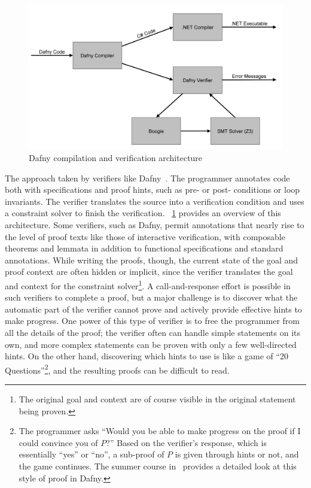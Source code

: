\begin{figure}[ht]
    \includegraphics[width=\textwidth]{img/dafny_architecture}
    \caption{Dafny compilation and verification
    architecture~\cite{Herbert2012}}\label{F:dafny_arch}
\end{figure}

The approach taken by verifiers like Dafny~\cite{leino2010dafny}. The programmer
annotates code both with specifications and proof hints, such as pre- or post-
conditions or loop invariants. The verifier translates the source into a
verification condition and uses a constraint solver to finish the verification.
\figurename~\ref{F:dafny_arch} provides an overview of this architecture. Some
verifiers, such as Dafny, permit annotations that nearly rise to the level of
proof texts like those of interactive verification, with composable theorems and
lemmata in addition to functional specifications and standard annotations. While
writing the proofs, though, the current state of the  goal and proof context are
often hidden or implicit, since the verifier translates the goal and context for
the constraint solver\footnote{The original goal and context are of course
visible in the original statement being proven.}. A call-and-response effort is
possible in such verifiers to complete a proof, but a major challenge is to
discover what the automatic part of the verifier cannot prove and actively
provide effective hints to make progress. One power of this type of verifier is
to free the programmer from all the details of the proof; the verifier often can
handle simple statements on its own, and more complex statements can be proven
with only a few well-directed hints. On the other hand, discovering which hints
to use is like a game of ``20 Questions''\footnote{The programmer asks ``Would
you be able to make progress on the proof if I could convince you of \(P\)?''
Based on the verifier's response, which is essentially ``yes'' or ``no'', a
sub-proof of \(P\) is given through hints or not, and the game continues. The
summer course in~\cite{Kapritsos_2020} provides a detailed look at this style of
proof in Dafny.}, and the resulting proofs can be difficult to read.


